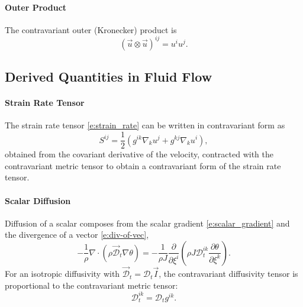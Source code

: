 \documentclass{report}
\begin{document}
\paragraph{Outer Product} The contravariant outer (Kronecker) product is 
\begin{equation}
(\vec{u} \otimes \vec{u})^{ij} = u^i u^j.
\end{equation}

\subsection{Derived Quantities in Fluid Flow}

\paragraph{Strain Rate Tensor} The strain rate tensor \eqref{e:strain_rate} can be written in contravariant form as
\begin{equation}
    S^{ij} = \frac{1}{2} \left(g^{ik} \nabla_k u^j + g^{kj} \nabla_k u^i \right),
\end{equation}
obtained from the covariant derivative of the velocity, contracted with the contravariant metric tensor to obtain a contravariant form of the strain rate tensor.

\paragraph{Scalar Diffusion} Diffusion of a scalar composes from the scalar gradient \eqref{e:scalar_gradient} and the divergence of a vector \eqref{e:div-of-vec}, 
\begin{equation}\label{e:scalar_diffusion}
    - \frac{1}{\rho} \nabla \cdot \left( \rho \vec{\mathcal{D}}_t \nabla \theta \right) = - \frac{1}{\rho J} \frac{\partial}{\partial \xi^i} \left(\rho J \mathcal{D}_t^{ik} \frac{\partial \theta}{\partial \xi^k}\right).
\end{equation}
For an isotropic diffusivity with $\vec{\mathcal{D}}_t = \mathcal{D}_t \vec{I}$, the contravariant diffusivity tensor is proportional to the contravariant metric tensor:
\[
\mathcal{D}_t^{ik} = \mathcal{D}_t g^{ik}.
\]
\end{document}
